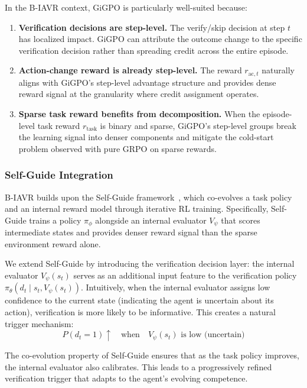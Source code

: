 In the B-IAVR context, GiGPO is particularly well-suited because:
\begin{enumerate}
    \item \textbf{Verification decisions are step-level.} The verify/skip decision at step $t$ has localized impact. GiGPO can attribute the outcome change to the specific verification decision rather than spreading credit across the entire episode.
    \item \textbf{Action-change reward is already step-level.} The reward $r_{\text{ac},t}$ naturally aligns with GiGPO's step-level advantage structure and provides dense reward signal at the granularity where credit assignment operates.
    \item \textbf{Sparse task reward benefits from decomposition.} When the episode-level task reward $r_{\text{task}}$ is binary and sparse, GiGPO's step-level groups break the learning signal into denser components and mitigate the cold-start problem observed with pure GRPO on sparse rewards.
\end{enumerate}


\subsubsection{Self-Guide Integration}

B-IAVR builds upon the Self-Guide framework~\cite{selfguide2026}, which co-evolves a task policy and an internal reward model through iterative RL training. Specifically, Self-Guide trains a policy $\pi_\phi$ alongside an internal evaluator $V_\psi$ that scores intermediate states and provides denser reward signal than the sparse environment reward alone.

We extend Self-Guide by introducing the verification decision layer: the internal evaluator $V_\psi(s_t)$ serves as an additional input feature to the verification policy $\pi_\theta(d_t \mid s_t, V_\psi(s_t))$. Intuitively, when the internal evaluator assigns low confidence to the current state (indicating the agent is uncertain about its action), verification is more likely to be informative. This creates a natural trigger mechanism:
\begin{equation}
P(d_t = 1) \uparrow \quad \text{when} \quad V_\psi(s_t) \text{ is low (uncertain)}
\label{eq:selfguide-trigger}
\end{equation}

The co-evolution property of Self-Guide ensures that as the task policy improves, the internal evaluator also calibrates. This leads to a progressively refined verification trigger that adapts to the agent's evolving competence.

